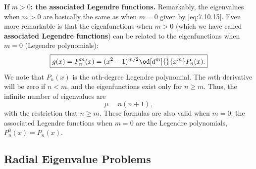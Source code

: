 \textbf{If} $m > 0$\textbf{: the associated Legendre functions.}  Remarkably, the eigenvalues when $m > 0$ are basically the same as when $m = 0$ given by \eqref{eq:7.10.15}.  Even more remarkable is that the eigenfunctions when $m > 0$ (which we have called \textbf{associated Legendre functions}) can be related to the eigenfunctions when $m = 0$ (Legendre polynomials):
\begin{equation}
\boxed{g(x) = P_n^m(x) = (x^2 - 1)^{m/2}\od[d^m]{}{x^m}P_n(x).}
\label{eq:7.10.19}
\end{equation}
We note that $P_n(x)$ is the $n$th-degree Legendre polynomial.  The $m$th derivative will be zero if $n < m$, and the eigenfunctions exist only for $n \geq m$.  Thus, the infinite number of eigenvalues are
\begin{equation}
\boxed{\mu = n(n+1),}
\label{eq:7.10.20}
\end{equation}
with the restriction that $n \geq m$.  These formulas are also valid when $m = 0$; the associated Legendre functions when $m = 0$ are the Legendre polynomials, $P_n^0(x) = P_n(x)$.

\subsection{Radial Eigenvalue Problems}
\label{sec:7.10.4}

